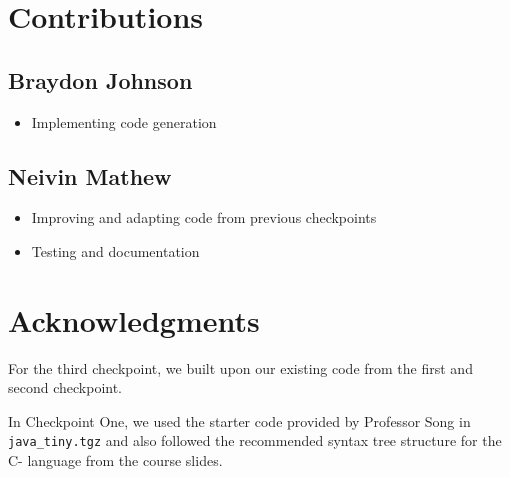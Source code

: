 \documentclass[12pt, letterpaper]{article}
\begin{document}
\section{Contributions}
\subsection{Braydon Johnson}
\begin{itemize}
\setlength\itemsep{0em}
\item Implementing code generation
\end{itemize}
\subsection{Neivin Mathew}
\begin{itemize}
\setlength\itemsep{0em}
\item Improving and adapting code from previous checkpoints
\item Testing and documentation
\end{itemize}

\section{Acknowledgments}
For the third checkpoint, we built upon our existing code from the first and second checkpoint.

In Checkpoint One, we used the starter code provided by Professor Song in \texttt{java\_tiny.tgz} and also followed the recommended syntax tree structure for the C- language from the course slides.
\end{document}
